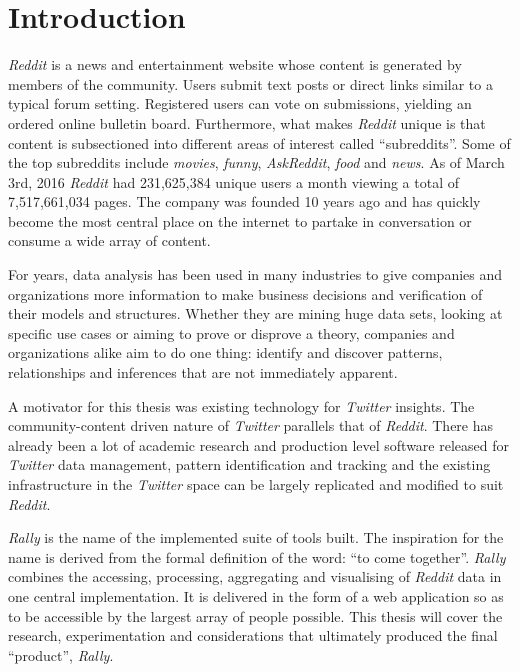 \documentclass[msc,oneside]{ubcthesis}%
\begin{document}

\mainmatter\setlength{\parskip}{1em}


\chapter{Introduction}
\textit{Reddit} is a news and entertainment website whose content is generated by members of the community. Users submit text posts or direct links similar to a typical forum setting. Registered users can vote on submissions, yielding an ordered online bulletin board. Furthermore, what makes \textit{Reddit} unique is that content is subsectioned into different areas of interest called ``subreddits''. Some of the top subreddits include \textit{movies}, \textit{funny}, \textit{AskReddit}, \textit{food} and \textit{news}. As of March 3rd, 2016 \textit{Reddit} had 231,625,384 unique users a month viewing a total of 7,517,661,034 pages. The company was founded 10 years ago and has quickly become the most central place on the internet to partake in conversation or consume a wide array of content.

For years, data analysis has been used in many industries to give companies and organizations more information to make business decisions and verification of their models and structures. Whether they are mining huge data sets, looking at specific use cases or aiming to prove or disprove a theory, companies and organizations alike aim to do one thing: identify and discover patterns, relationships and inferences that are not immediately apparent.
\par
A motivator for this thesis was existing technology for \textit{Twitter} insights. The community-content driven nature of \textit{Twitter} parallels that of \textit{Reddit}. There has already been a lot of academic research and production level software released for \textit{Twitter} data management, pattern identification and tracking and the existing infrastructure in the \textit{Twitter} space can be largely replicated and modified to suit \textit{Reddit}.

\textit{Rally} is the name of the implemented suite of tools built. The inspiration for the name is derived from the formal definition of the word: ``to come together''. \textit{Rally} combines the accessing, processing, aggregating and visualising of \textit{Reddit} data in one central implementation. It is delivered in the form of a web application so as to be accessible by the largest array of people possible. This thesis will cover the research, experimentation and considerations that ultimately produced the final ``product'', \textit{Rally}.
\end{document}
